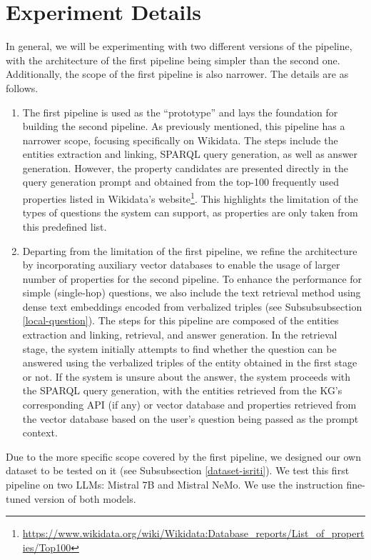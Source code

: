 \section{Experiment Details}
\label{exp-detail}
In general, we will be experimenting with two different versions of the pipeline, with the architecture of the first pipeline being simpler than the second one. Additionally, the scope of the first pipeline is also narrower. The details are as follows.
\begin{enumerate}
    \item The first pipeline is used as the ``prototype'' and lays the foundation for building the second pipeline. As previously mentioned, this pipeline has a narrower scope, focusing specifically on Wikidata. The steps include the entities extraction and linking, SPARQL query generation, as well as answer generation. However, the property candidates are presented directly in the query generation prompt and obtained from the top-100 frequently used properties listed in Wikidata's website\footnote{\url{https://www.wikidata.org/wiki/Wikidata:Database_reports/List_of_properties/Top100}}. This highlights the limitation of the types of questions the system can support, as properties are only taken from this predefined list.
    \item Departing from the limitation of the first pipeline, we refine the architecture by incorporating auxiliary vector databases to enable the usage of larger number of properties for the second pipeline. To enhance the performance for simple (single-hop) questions, we also include the text retrieval method using dense text embeddings encoded from verbalized triples (see Subsubsubsection \ref{local-question}). The steps for this pipeline are composed of the entities extraction and linking, retrieval, and answer generation. In the retrieval stage, the system initially attempts to find whether the question can be answered using the verbalized triples of the entity obtained in the first stage or not. If the system is unsure about the answer, the system proceeds with the SPARQL query generation, with the entities retrieved from the KG's corresponding API (if any) or vector database and properties retrieved from the vector database based on the user's question being passed as the prompt context.
\end{enumerate}

Due to the more specific scope covered by the first pipeline, we designed our own dataset to be tested on it (see Subsubsection \ref{dataset-isriti}). We test this first pipeline on two LLMs: Mistral 7B and Mistral NeMo. We use the instruction fine-tuned version of both models.

